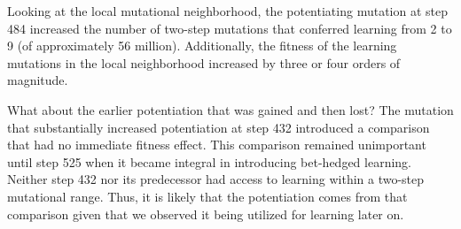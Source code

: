 Looking at the local mutational neighborhood, the potentiating mutation at step 484 increased the number of two-step mutations that conferred learning from 2 to 9 (of approximately 56 million). 
Additionally, the fitness of the learning mutations in the local neighborhood increased by three or four orders of magnitude.

What about the earlier potentiation that was gained and then lost?
The mutation that substantially increased potentiation at step 432  introduced a comparison that had no immediate fitness effect. 
This comparison remained unimportant until step 525 when it became integral in introducing bet-hedged learning. %
Neither step 432 nor its predecessor had access to learning within a two-step mutational range.
Thus, it is likely that the potentiation comes from that comparison given that we observed it being utilized for learning later on.


